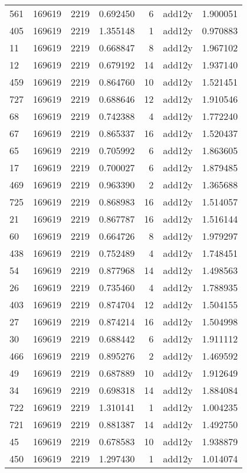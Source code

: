 \begin{tabular}{lrrrrlr}
561 & 169619 & 2219 & 0.692450 & 6 & add12y & 1.900051 \\
405 & 169619 & 2219 & 1.355148 & 1 & add12y & 0.970883 \\
11 & 169619 & 2219 & 0.668847 & 8 & add12y & 1.967102 \\
12 & 169619 & 2219 & 0.679192 & 14 & add12y & 1.937140 \\
459 & 169619 & 2219 & 0.864760 & 10 & add12y & 1.521451 \\
727 & 169619 & 2219 & 0.688646 & 12 & add12y & 1.910546 \\
68 & 169619 & 2219 & 0.742388 & 4 & add12y & 1.772240 \\
67 & 169619 & 2219 & 0.865337 & 16 & add12y & 1.520437 \\
65 & 169619 & 2219 & 0.705992 & 6 & add12y & 1.863605 \\
17 & 169619 & 2219 & 0.700027 & 6 & add12y & 1.879485 \\
469 & 169619 & 2219 & 0.963390 & 2 & add12y & 1.365688 \\
725 & 169619 & 2219 & 0.868983 & 16 & add12y & 1.514057 \\
21 & 169619 & 2219 & 0.867787 & 16 & add12y & 1.516144 \\
60 & 169619 & 2219 & 0.664726 & 8 & add12y & 1.979297 \\
438 & 169619 & 2219 & 0.752489 & 4 & add12y & 1.748451 \\
54 & 169619 & 2219 & 0.877968 & 14 & add12y & 1.498563 \\
26 & 169619 & 2219 & 0.735460 & 4 & add12y & 1.788935 \\
403 & 169619 & 2219 & 0.874704 & 12 & add12y & 1.504155 \\
27 & 169619 & 2219 & 0.874214 & 16 & add12y & 1.504998 \\
30 & 169619 & 2219 & 0.688442 & 6 & add12y & 1.911112 \\
466 & 169619 & 2219 & 0.895276 & 2 & add12y & 1.469592 \\
49 & 169619 & 2219 & 0.687889 & 10 & add12y & 1.912649 \\
34 & 169619 & 2219 & 0.698318 & 14 & add12y & 1.884084 \\
722 & 169619 & 2219 & 1.310141 & 1 & add12y & 1.004235 \\
721 & 169619 & 2219 & 0.881387 & 14 & add12y & 1.492750 \\
45 & 169619 & 2219 & 0.678583 & 10 & add12y & 1.938879 \\
450 & 169619 & 2219 & 1.297430 & 1 & add12y & 1.014074 \\

\end{tabular}
